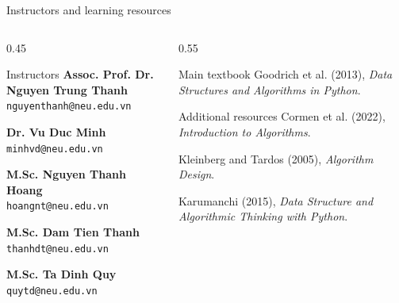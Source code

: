 \documentclass[aspectratio=169]{beamer}
\begin{document}
\begin{frame}{Instructors and learning resources}
  \begin{columns}[T]
    \begin{column}{0.45\textwidth}
      \begin{block}{Instructors}
        \small
        \textbf{Assoc. Prof. Dr. Nguyen Trung Thanh}\\
        \texttt{nguyenthanh@neu.edu.vn}

        \medskip
        \textbf{Dr. Vu Duc Minh}\\
        \texttt{minhvd@neu.edu.vn}

        \medskip
        \textbf{M.Sc. Nguyen Thanh Hoang}\\
        \texttt{hoangnt@neu.edu.vn}

        \medskip
        \textbf{M.Sc. Dam Tien Thanh}\\
        \texttt{thanhdt@neu.edu.vn}

        \medskip
        \textbf{M.Sc. Ta Dinh Quy}\\
        \texttt{quytd@neu.edu.vn}
      \end{block}
    \end{column}
    \begin{column}{0.55\textwidth}
      \begin{exampleblock}{Main textbook}
        \small
        Goodrich et al. (2013), \emph{Data Structures and Algorithms in Python}.
      \end{exampleblock}
      \begin{alertblock}{Additional resources}
        \small
        Cormen et al. (2022), \emph{Introduction to Algorithms}.

        \medskip
        Kleinberg and Tardos (2005), \emph{Algorithm Design}.

        \medskip
        Karumanchi (2015), \emph{Data Structure and Algorithmic Thinking with Python}.
      \end{alertblock}
    \end{column}
  \end{columns}
\end{frame}
\end{document}

